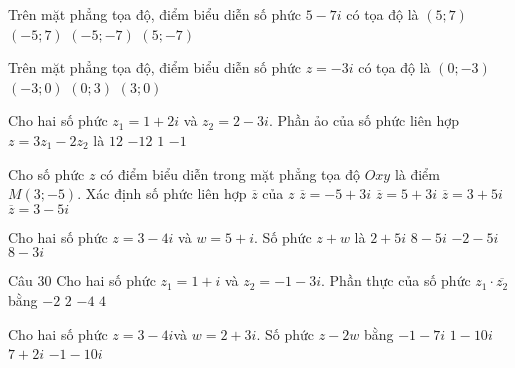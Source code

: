 \begin{ex}%
Trên mặt phẳng tọa độ, điểm biểu diễn số phức $5-7i$ có tọa độ là
\choice
{$\left(5;7\right)$}
{$\left(-5;7\right)$}
{$\left(-5;-7\right)$}
{\True $\left(5;-7\right)$}
\end{ex}

\begin{ex}%
Trên mặt phẳng tọa độ, điểm biểu diễn số phức $z=-3 i$ có tọa độ là
\choice
{\True $(0;-3)$}
{$(-3; 0)$}
{$(0; 3)$}
{$(3; 0)$}
\end{ex}

\begin{ex}%
Cho hai số phức $z_1 = 1 + 2i$ và $z_2 = 2 - 3i$. Phần ảo của số phức liên hợp $z = 3z_1 - 2z_2$ là
\choice
{$12$}
{\True $-12$}
{$1$}
{$-1$}
\end{ex}

\begin{ex}%
Cho số phức $z$ có điểm biểu diễn trong mặt phẳng tọa độ $O x y$ là điểm $M(3 ;-5)$. Xác định số phức liên hợp $\overline{z}$ của $z$
\choice
{$\overline{z}=-5+3 i$}
{$\overline{z}=5+3 i$}
{\True $\overline{z}=3+5 i$}
{$\overline{z}=3-5 i$}
\end{ex}

\begin{ex}%
Cho hai số phức $z=3-4i$ và $w=5+i$. Số phức $z+w$ là
\choice
{$2+5i$}
{$8-5i$}
{$-2-5i$}
{\True $8-3i$}
\end{ex}

\begin{ex}Câu 30%
Cho hai số phức $z_1=1+i$ và $z_2=-1-3i$. Phần thực của số phức $z_1 \cdot \overline{z_2}$ bằng
\choice
{$-2$}
{$2$}
{\True $-4$}
{$4$}
\end{ex}

\begin{ex}%
Cho hai số phức $z=3-4i$và $w=2+3i$. Số phức $z-2w$ bằng
\choice
{ $-1-7i$}
{ $1-10i$}
{ $7+2i$}
{\True $-1-10i$}
\end{ex}


